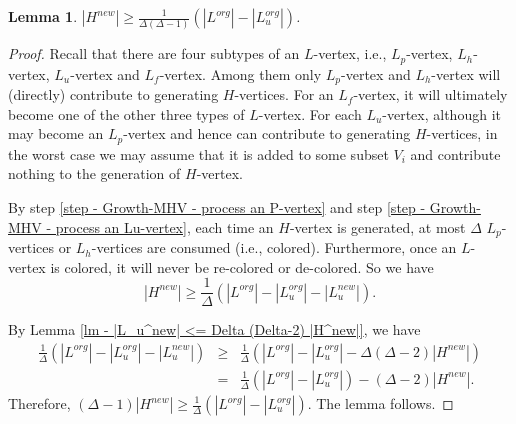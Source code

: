 \documentclass[11pt]{article}
\newtheorem{lemma}{Lemma}[section]
\newcommand{\qed}{\vrule height4pt width4pt depth2pt}
\begin{document}
\begin{lemma}
\label{lm - lower bound on |H^new|}
$|H^{new}| \geq \frac{1}{\Delta(\Delta-1)}(|L^{org}| - |L_{u}^{org}|)$.
\end{lemma}
\begin{proof}
Recall that there are four subtypes of an $L$-vertex, i.e., $L_p$-vertex,
$L_{h}$-vertex, $L_{u}$-vertex and $L_f$-vertex.
Among them only $L_p$-vertex and $L_{h}$-vertex will (directly) contribute
to generating $H$-vertices.
For an $L_f$-vertex, it will ultimately become one of the other three
types of $L$-vertex.
For each $L_{u}$-vertex, although it may become an $L_p$-vertex and hence
can contribute to generating $H$-vertices, in the worst case we may
assume that it is added to some subset $V_i$
and contribute nothing to the generation of $H$-vertex.

By step \ref{step - Growth-MHV - process an P-vertex} and
step \ref{step - Growth-MHV - process an Lu-vertex},
each time an $H$-vertex is generated, at most $\Delta$ $L_p$-vertices or
$L_{h}$-vertices are consumed (i.e., colored). Furthermore, once
an $L$-vertex is colored, it will never be re-colored or de-colored.
So we have
\begin{equation}
|H^{new}| \geq \frac{1}{\Delta}(|L^{org}| - |L_{u}^{org}| - |L_{u}^{new}|).
\nonumber
\end{equation}

By Lemma \ref{lm - |L_u^new| <= Delta (Delta-2) |H^new|},
we have
\begin{eqnarray}
\frac{1}{\Delta}(|L^{org}| - |L_{u}^{org}| - |L_{u}^{new}|)
&\geq& \frac{1}{\Delta}(|L^{org}| - |L_{u}^{org}| - \Delta(\Delta-2)|H^{new}|)
\nonumber \\
&=& \frac{1}{\Delta}(|L^{org}| - |L_{u}^{org}|) - (\Delta-2)|H^{new}|.
\nonumber
\end{eqnarray}
Therefore, $(\Delta-1) |H^{new}| \geq \frac{1}{\Delta}(|L^{org}| - |L_{u}^{org}|)$.
The lemma follows.
\qed
\end{proof}
\end{document}
